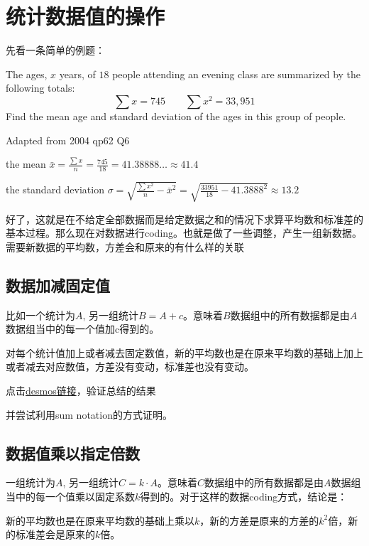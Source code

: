 \section{统计数据值的操作}
先看一条简单的例题：
\begin{ExampleBox}
The ages, $x$ years, of $18$ people attending an evening class are summarized by the following totals:
\[ \sum x = 745  \qquad \sum x^2 =33,951 \]
Find the mean age and standard deviation of the ages in this group of people.

\makebox{}\hfill Adapted from 2004 qp62 Q6 

\tcblower
the mean $\bar{x}=\frac{\sum x}{n}=\frac{745}{18} = 41.38888\ldots \approx 41.4$

the standard deviation $\sigma = \sqrt{\frac{\sum x^2}{n}-\bar{x}^2}=\sqrt{\frac{33951}{18}-41.3888^2} \approx 13.2$
\end{ExampleBox}


好了，这就是在不给定全部数据而是给定数据之和的情况下求算平均数和标准差的基本过程。那么现在对数据进行coding。也就是做了一些调整，产生一组新数据。需要新数据的平均数，方差会和原来的有什么样的关联

\subsection*{数据加减固定值}
比如一个统计为$A$, 另一组统计$B=A+c$。意味着$B$数据组中的所有数据都是由$A$数据组当中的每一个值加c得到的。

\begin{SummBox}
对每个统计值加上或者减去固定数值，新的平均数也是在原来平均数的基础上加上或者减去对应数值，方差没有变动，标准差也没有变动。
\end{SummBox}

\begin{TaskBox}
点击\href{https://www.desmos.com/calculator/sdttllahos}{desmos链接}，验证总结的结果

并尝试利用sum notation的方式证明。
\end{TaskBox}


\subsection*{数据值乘以指定倍数}
一组统计为$A$, 另一组统计$C=k\cdot A$。意味着$C$数据组中的所有数据都是由$A$数据组当中的每一个值乘以固定系数$k$得到的。对于这样的数据coding方式，结论是：

\begin{SummBox}
新的平均数也是在原来平均数的基础上乘以$k$，新的方差是原来的方差的$k^2$倍，新的标准差会是原来的$k$倍。
\end{SummBox}


